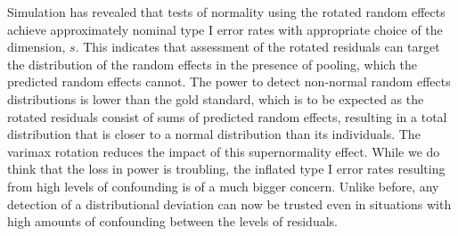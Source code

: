 \documentclass[12pt]{article} %
\begin{document}

Simulation has revealed that tests of normality using the rotated random effects achieve approximately nominal type I error rates with appropriate choice of the dimension, $s$. This indicates that assessment of the rotated residuals can target the distribution of the random effects in the presence of pooling, which the predicted random effects cannot. The power to detect non-normal random effects distributions is lower than the gold standard, which is to be expected as the rotated residuals consist of sums of predicted random effects, resulting in a total distribution that is closer to a normal distribution than its individuals.  %
The varimax rotation reduces the impact of this supernormality effect. %
While we do think that the loss in power is troubling,
 the inflated type I error rates resulting from high levels of confounding is of a much bigger concern. Unlike before,  any detection of a distributional deviation can now be trusted even in situations with high amounts of  confounding between the levels of residuals.

  
 

\end{document}
